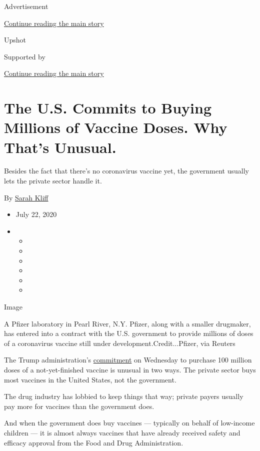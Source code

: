 Advertisement

\protect\hyperlink{after-top}{Continue reading the main story}

Upshot

Supported by

\protect\hyperlink{after-sponsor}{Continue reading the main story}

\hypertarget{the-us-commits-to-buying-millions-of-vaccine-doses-why-thats-unusual}{%
\section{The U.S. Commits to Buying Millions of Vaccine Doses. Why
That's
Unusual.}\label{the-us-commits-to-buying-millions-of-vaccine-doses-why-thats-unusual}}

Besides the fact that there's no coronavirus vaccine yet, the government
usually lets the private sector handle it.

By \href{https://www.nytimes3xbfgragh.onion/by/sarah-kliff}{Sarah Kliff}

\begin{itemize}
\item
  July 22, 2020
\item
  \begin{itemize}
  \item
  \item
  \item
  \item
  \item
  \item
  \end{itemize}
\end{itemize}

Image

A Pfizer laboratory in Pearl River, N.Y. Pfizer, along with a smaller
drugmaker, has entered into a contract with the U.S. government to
provide millions of doses of a coronavirus vaccine still under
development.Credit...Pfizer, via Reuters

The Trump administration's
\href{https://www.nytimes3xbfgragh.onion/2020/07/22/us/politics/pfizer-coronavirus-vaccine.html}{commitment}
on Wednesday to purchase 100 million doses of a not-yet-finished vaccine
is unusual in two ways. The private sector buys most vaccines in the
United States, not the government.

The drug industry has lobbied to keep things that way; private payers
usually pay more for vaccines than the government does.

And when the government does buy vaccines --- typically on behalf of
low-income children --- it is almost always vaccines that have already
received safety and efficacy approval from the Food and Drug
Administration.


